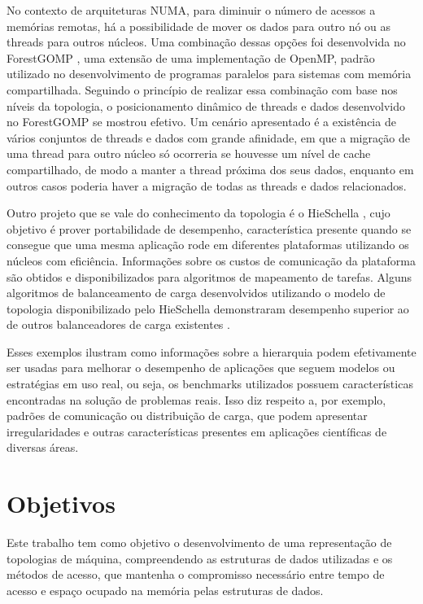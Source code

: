 No contexto de arquiteturas NUMA, para diminuir o número de acessos a memórias remotas, há a possibilidade de mover os dados para outro nó ou as threads para outros núcleos.
Uma combinação dessas opções foi desenvolvida no ForestGOMP \cite{FGOMP}, uma extensão de uma implementação de OpenMP, padrão utilizado no desenvolvimento de programas paralelos para sistemas com memória compartilhada.
Seguindo o princípio de realizar essa combinação com base nos níveis da topologia, o posicionamento dinâmico de threads e dados desenvolvido no ForestGOMP se mostrou efetivo.
Um cenário apresentado é a existência de vários conjuntos de threads e dados com grande afinidade, em que a migração de uma thread para outro núcleo só ocorreria se houvesse um nível de cache compartilhado, de modo a manter a thread próxima dos seus dados, enquanto em outros casos poderia haver a migração de todas as threads e dados relacionados.

Outro projeto que se vale do conhecimento da topologia é o HieSchella \cite{HieSchella},
cujo objetivo é prover portabilidade de desempenho, característica presente quando se consegue que
uma mesma aplicação rode em diferentes plataformas utilizando os núcleos com eficiência.
Informações sobre os custos de comunicação da plataforma são obtidos e disponibilizados para algoritmos de mapeamento de tarefas.
Alguns algoritmos de balanceamento de carga desenvolvidos utilizando o modelo de topologia disponibilizado pelo HieSchella demonstraram desempenho superior ao de outros balanceadores de carga existentes \cite{tese}.

Esses exemplos ilustram como informações sobre a hierarquia podem efetivamente ser usadas para melhorar o desempenho de aplicações que seguem modelos ou estratégias em uso real, ou seja, os benchmarks utilizados possuem características encontradas na solução de problemas reais.
Isso diz respeito a, por exemplo, padrões de comunicação ou distribuição de carga, que podem apresentar irregularidades e outras características presentes em aplicações científicas de diversas áreas.



\section{Objetivos}
\label{sec:objetivos}

Este trabalho tem como objetivo o desenvolvimento de uma representação de topologias de máquina, compreendendo as estruturas de dados utilizadas e os métodos de acesso, que mantenha o compromisso necessário entre tempo de acesso e espaço ocupado na memória pelas estruturas de dados.


